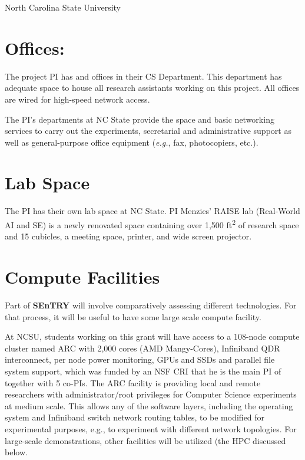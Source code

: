 \documentclass{NSF}
\newcommand{\IT}{{\bf {\sffamily SEnTRY}}}
\begin{document}
\begin{nsfreferences}
      
\end{nsfreferences}
\newpage
\begin{Facilities}{North Carolina State University}

\section*{Offices:}
The project PI has
and offices in their   CS Department.  This
department
has adequate space to house all research assistants
working on this project. All offices are wired for high-speed network
access.

The PI's departments at  NC State provide the space and basic networking services to
carry out the experiments, secretarial and administrative support as
well as general-purpose office equipment ({\em e.g.}, fax, photocopiers,
etc.).

\section*{Lab Space}
The PI has their own lab space at   NC State.
PI  Menzies' RAISE lab (Real-World 
AI and SE) is a newly renovated space 
containing over 1,500 ft\textsuperscript{2} of research space and 
15 cubicles, a meeting space, printer, and wide screen projector. 

\section*{Compute Facilities}
Part of {\IT} will involve comparatively assessing different 
technologies.   For that process, it will be useful to have some large scale compute facility.
 
 At NCSU, students working on this grant will have access to  a 108-node compute cluster named ARC with 
2,000 cores (AMD Mangy-Cores), Infiniband QDR interconnect, per node
power monitoring, GPUs and SSDs and parallel file system support,
which was funded by an NSF CRI that he is the main PI of together with
5 co-PIs.  
The ARC facility is providing local and remote researchers with
administrator/root privileges for Computer Science experiments at
medium scale. This allows any of the software layers, including the
operating system and Infiniband switch network routing tables, to be
modified for experimental purposes, e.g., to experiment with different
network topologies.  For large-scale demonstrations, other 
facilities will be utilized (the HPC discussed below.



\end{Facilities}
\end{document}
